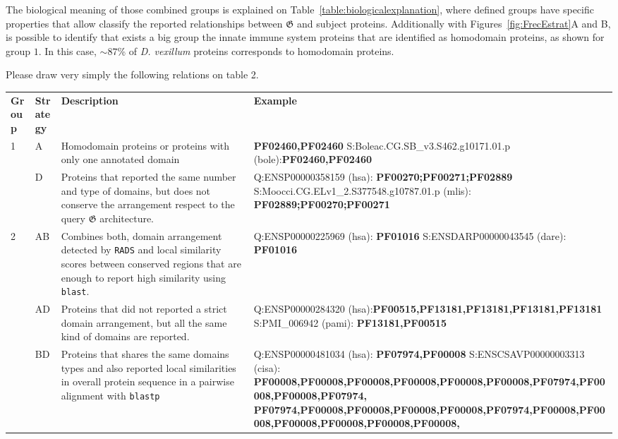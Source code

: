 \documentclass[11pt]{article}
\newcommand{\TODO}[1]{\begingroup\color{red}#1\endgroup}
\begin{document}
The biological meaning of those combined groups is explained on Table~\ref{table:biologicalexplanation},
where defined groups have specific properties that allow classify the 
reported relationships between $\boldsymbol{\mathfrak{G}}$ and subject proteins.
Additionally with Figures~\ref{fig:FrecEstrat}A and B, is possible to identify
that exists a big group the innate immune system proteins that are identified as homodomain proteins,
 as shown for group $1$. In this case, $\sim87$\% of \textit{D. vexillum} proteins corresponds to
homodomain proteins.  


\TODO{Please draw very simply the following relations on table 2.}
\begin{table}
\small
\centering
\begin{center}
\begin{tabular}{p{1cm}p{1.2cm}p{9cm}p{10cm}} 
\toprule
\textbf{Group} & \textbf{Strategy} & \textbf{Description}& \textbf{Example}\\
1 & A & Homodomain proteins or proteins with only one annotated domain & 
\textbf{PF02460,PF02460} S:Boleac.CG.SB\_v3.S462.g10171.01.p (bole):\textbf{PF02460,PF02460}\\
& D & Proteins that reported the same number and type of domains, but does 
not conserve the arrangement respect to the query $\boldsymbol{\mathfrak{G}}$ architecture. &
Q:ENSP00000358159 (hsa): \textbf{PF00270;PF00271;PF02889} S:Moocci.CG.ELv1\_2.S377548.g10787.01.p (mlis): \textbf{PF02889;PF00270;PF00271} \\
\midrule
2 & AB & Combines both, domain arrangement detected by \texttt{RADS} and local similarity scores 
between conserved regions that are enough to report high similarity using \texttt{blast}. & 
Q:ENSP00000225969 (hsa): \textbf{PF01016} S:ENSDARP00000043545 (dare): \textbf{PF01016} \\
& AD & Proteins that did not reported a strict domain arrangement, but all the same kind of
domains are reported. & Q:ENSP00000284320 (hsa):\textbf{PF00515,PF13181,PF13181,PF13181,PF13181} S:PMI\_006942 (pami): \textbf{PF13181,PF00515} \\
& BD & Proteins that shares the same domains types and also reported local similarities in overall
protein sequence in a pairwise alignment with \texttt{blastp} & Q:ENSP00000481034 (hsa): \textbf{PF07974,PF00008} 
S:ENSCSAVP00000003313 (cisa): \textbf{PF00008,PF00008,PF00008,PF00008,PF00008,PF00008,PF07974,PF00008,PF00008,PF07974,
PF07974,PF00008,PF00008,PF00008,PF00008,PF07974,PF00008,PF00008,PF00008,PF00008,PF00008,PF00008,
}
\end{tabular}
\end{center}
\end{table}
\end{document}
